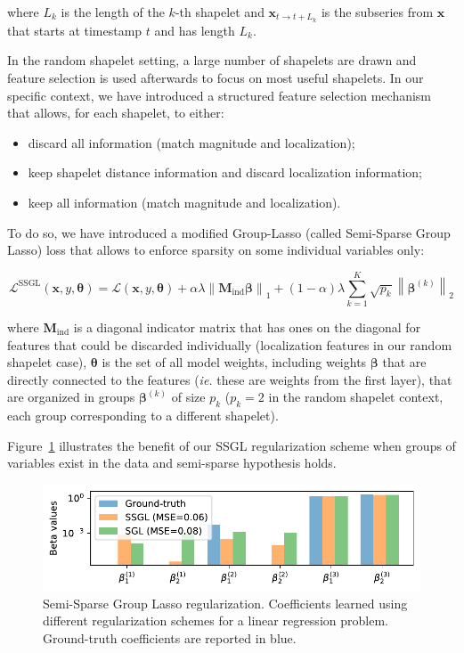 where $L_k$ is the length of the $k$-th shapelet and
$\mathbf{x}_{t \rightarrow t+L_k}$
is the subseries from $\mathbf{x}$ that starts at timestamp $t$ and has length
$L_k$.

In the random shapelet setting, a large number of shapelets are drawn and
feature selection is used afterwards to focus on most useful shapelets.
In our specific context, we have introduced a structured feature selection
mechanism that allows, for each shapelet, to either:

\begin{itemize}
\item discard all information (match magnitude and localization);
\item keep shapelet distance information and discard localization information;
\item keep all information (match magnitude and localization).
\end{itemize}

To do so, we have introduced a modified Group-Lasso (called
Semi-Sparse Group Lasso) loss that allows to enforce sparsity on some individual
variables only:

\begin{equation}
    \mathcal{L}^{\mathrm{SSGL}}(\mathbf{x}, y, \boldsymbol{\theta}) =
        \mathcal{L}(\mathbf{x}, y, \boldsymbol{\theta})
        + \alpha \lambda
            \left\| \mathbf{M}_\text{ind} \boldsymbol{\beta} \right\|_1
        + (1-\alpha) \lambda \sum_{k=1}^{K} \sqrt{p_k}
            \left\| \boldsymbol{\beta}^{(k)} \right\|_2
\end{equation}

where $\mathbf{M}_\text{ind}$ is a diagonal indicator matrix that has ones on
the diagonal for features that could be discarded individually (localization
features in our random shapelet case), $\boldsymbol{\theta}$ is the set of
all model weights, including weights $\boldsymbol{\beta}$ that are directly
connected to the features (\emph{ie.} these are weights from the first layer), that
are organized in groups $\boldsymbol{\beta}^{(k)}$ of size $p_k$ ($p_k=2$ in the
random shapelet context, each group corresponding to a different shapelet).

Figure~\ref{fig:ssgl} illustrates the benefit of our SSGL regularization scheme
when groups of variables exist in the data and semi-sparse hypothesis holds.

\begin{figure}[t]
\centering
\includegraphics[width=.8\textwidth]{fig/ssgl}
\caption{Semi-Sparse Group Lasso regularization. Coefficients learned using
different regularization schemes for a linear regression problem. Ground-truth
coefficients are reported in blue.\label{fig:ssgl}}
\end{figure}

